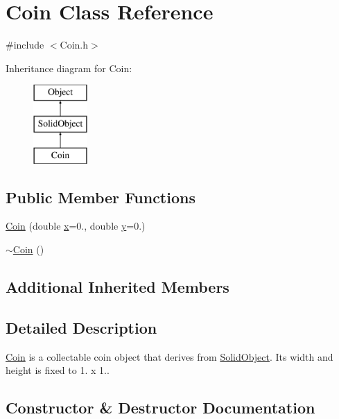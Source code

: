 \hypertarget{class_coin}{}\section{Coin Class Reference}
\label{class_coin}


{\ttfamily \#include $<$Coin.\+h$>$}

Inheritance diagram for Coin\+:\begin{figure}[H]
\begin{center}
\leavevmode
\includegraphics[height=3.000000cm]{class_coin}
\end{center}
\end{figure}
\subsection*{Public Member Functions}
\begin{DoxyCompactItemize}
\item 
\hyperlink{class_coin_a2ea18dd58f299998b8fff9331fa9c275}{Coin} (double \hyperlink{class_object_a02010c1708632be33a760486b1f648f8}{x}=0., double \hyperlink{class_object_a542c4d6094ace575fb4a28f46b9cc6a1}{y}=0.)
\item 
\hyperlink{class_coin_ad0371a6d98c194a0f6de615206829b16}{$\sim$\+Coin} ()
\end{DoxyCompactItemize}
\subsection*{Additional Inherited Members}


\subsection{Detailed Description}
\hyperlink{class_coin}{Coin} is a collectable coin object that derives from \hyperlink{class_solid_object}{Solid\+Object}. It\textquotesingle{}s width and height is fixed to 1. x 1.. 

\subsection{Constructor \& Destructor Documentation}
